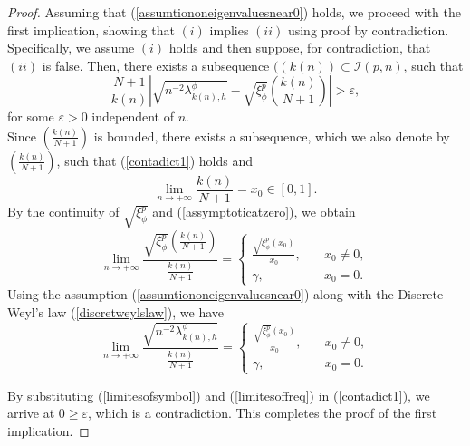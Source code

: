\documentclass[11pt]{article}
\begin{document}
\begin{proof}
Assuming that (\ref{assumtiononeigenvaluesnear0}) holds, we proceed with the first implication, showing that $(i)$ implies $(ii)$ using proof by contradiction. Specifically, we assume $(i)$ holds and then suppose, for contradiction, that $(ii)$ is false. Then,  there exists a subsequence $((k(n))\subset \mathcal{I}(p,n)$, such that 
 \begin{equation}\label{contadict1}
     \frac{N+1}{k(n)}\left|\sqrt{n^{-2}\lambda_{k(n),h}^{\phi}}-\sqrt{\xi_{\phi}^p}\left(\frac{k(n)}{N+1}\right)\right|>\varepsilon,
 \end{equation}
 for some $\varepsilon>0$  independent of $n$.\\

 Since  $\left(\frac{k(n)}{N+1}\right)$ is bounded, there exists a subsequence, which we also denote by  $\left(\frac{k(n)}{N+1}\right)$, such that (\ref{contadict1}) holds and $$\lim_{n \rightarrow +\infty}\frac{k(n)}{N+1}=x_0\in[0,1].$$
By the continuity of $\sqrt{\xi^p_{\phi}}$ and (\ref{assymptoticatzero}), we obtain
 \begin{equation}\label{limitesofsymbol}
     \lim_{n \rightarrow +\infty}\frac{\sqrt{\xi_{\phi}^p}\left(\frac{k(n)}{N+1}\right)}{\frac{k(n)}{N+1}}=\left\{
\begin{array}{ll}
\frac{\sqrt{\xi_{\phi}^p}(x_0)}{x_0},&\quad x_0\neq 0,\\
\gamma,&\quad x_0=0.
\end{array}
\right.\end{equation}
Using the assumption (\ref{assumtiononeigenvaluesnear0}) along with the Discrete Weyl’s law (\ref{discretweylslaw}), we have
\begin{equation}\label{limitesoffreq}
     \lim_{n \rightarrow +\infty}\frac{\sqrt{n^{-2}\lambda_{k(n),h}^{\phi}}}{\frac{k(n)}{N+1}}=\left\{
\begin{array}{ll}
\frac{\sqrt{\xi_{\phi}^p}(x_0)}{x_0},&\quad x_0\neq 0,\\
\gamma,&\quad x_0=0.
\end{array}
\right.\end{equation}


By substituting  (\ref{limitesofsymbol}) and (\ref{limitesoffreq}) in (\ref{contadict1}),  we arrive at $0\geq \varepsilon$, which is a contradiction. This completes the proof of the first implication.


\end{proof}
\end{document}
